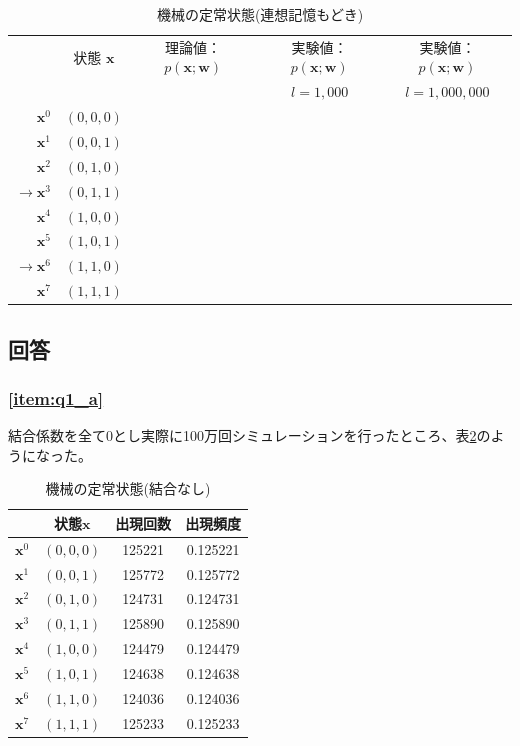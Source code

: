 \documentclass[a4j, uplatex, fleqn, dvipdfmx]{jsarticle} %
\begin{document}
\begin{table}[H]
  \caption{機械の定常状態(連想記憶もどき)}
  \label{table:q1_c_sample}
  \centering
  \begin{tabular}{|r|c|c|c|c|}
    \hline
     & 状態 $\bm{x}$ & 理論値： $p(\bm{x} ; \bm{w})$ & 実験値： $p(\bm{x} ; \bm{w})$ & 実験値： $p(\bm{x} ; \bm{w})$ \\
     & & & $l=1,000$ & $l=1,000,000$ \\
    \hline
    $            \bm{x}^{0}$ & $(0,0,0)$ & & & \\
    $            \bm{x}^{1}$ & $(0,0,1)$ & & & \\
    $            \bm{x}^{2}$ & $(0,1,0)$ & & & \\
    $\rightarrow \bm{x}^{3}$ & $(0,1,1)$ & & & \\
    $            \bm{x}^{4}$ & $(1,0,0)$ & & & \\
    $            \bm{x}^{5}$ & $(1,0,1)$ & & & \\
    $\rightarrow \bm{x}^{6}$ & $(1,1,0)$ & & & \\
    $            \bm{x}^{7}$ & $(1,1,1)$ & & & \\
    \hline
  \end{tabular}
\end{table}

\subsection{回答}
\subsubsection{\ref{item:q1_a}}
結合係数を全て0とし実際に100万回シミュレーションを行ったところ、表\ref{table:q1_a}のようになった。

\begin{table}[H]
  \caption{機械の定常状態(結合なし)}
  \label{table:q1_a}
  \centering
  \begin{tabular}{|c|c|c|c|}
    \hline
     & 状態$\bm{x}$ & 出現回数 & 出現頻度 \\
    \hline
    $\bm{x}^{0}$ & $(0,0,0)$ & 125221 & 0.125221 \\
    $\bm{x}^{1}$ & $(0,0,1)$ & 125772 & 0.125772 \\
    $\bm{x}^{2}$ & $(0,1,0)$ & 124731 & 0.124731 \\
    $\bm{x}^{3}$ & $(0,1,1)$ & 125890 & 0.125890 \\
    $\bm{x}^{4}$ & $(1,0,0)$ & 124479 & 0.124479 \\
    $\bm{x}^{5}$ & $(1,0,1)$ & 124638 & 0.124638 \\
    $\bm{x}^{6}$ & $(1,1,0)$ & 124036 & 0.124036 \\
    $\bm{x}^{7}$ & $(1,1,1)$ & 125233 & 0.125233 \\
    \hline
  \end{tabular}
\end{table}
\end{document}
